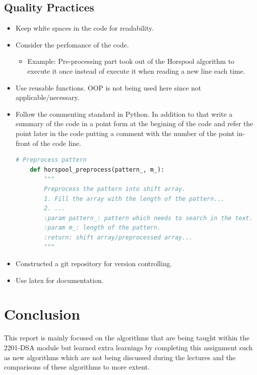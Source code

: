 \documentclass[12pt]{article}
\begin{document}
\subsection{Quality Practices}
\begin{itemize}
    \item Keep white spaces in the code for readability.

    \item Consider the perfomance of the code.
    \begin{itemize}
        \item Example: Pre-processing part took out of the Horspool algorithm to execute it once instead of execute it when reading a new line each time.
    \end{itemize}

    \item Use reusable functions. OOP is not being used here since not applicable/necessary.

    \item Follow the commenting standard in Python. In addition to that write a summary of the code in a point form at the begining of the code and refer the point later in the code putting a comment with the number of the point in-front of the code line.
    \begin{lstlisting}[language=Python]
    # Preprocess pattern
    def horspool_preprocess(pattern_, m_):
        """
        Preprocess the pattern into shift array.
        1. Fill the array with the length of the pattern...
        2. ...
        :param pattern_: pattern which needs to search in the text.
        :param m_: length of the pattern.
        :return: shift array/preprocessed array...
        """
    \end{lstlisting}

    \item Constructed a git repository for version controlling.

    \item Use latex for documentation.
\end{itemize}

\newpage

\section{Conclusion}
This report is mainly focused on the algorithms that are being taught within the 2201-DSA module but learned extra learnings by completing this assignment such as new algorithms which are not being discussed during the lectures and the comparisons of these algorithms to more extent.

\newpage

\printbibliography %
\end{document}
